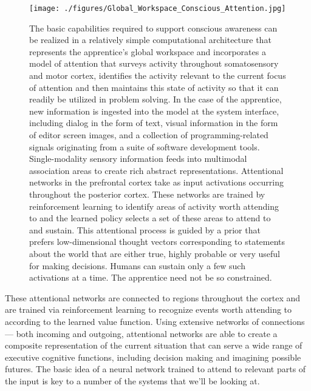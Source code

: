 \documentclass[letterpaper,11pt]{article}
\def\urlh#1{{}}
\def\emdash{---}
\begin{document}

\begin{figure}
%
  \begin{center} 
    \texttt{[image: ./figures/Global\_Workspace\_Conscious\_Attention.jpg]} %
  \end{center}
%
  \caption{The basic capabilities required to support conscious awareness can be realized in a relatively simple computational architecture that represents the apprentice's global workspace and incorporates a model of attention that surveys activity throughout somatosensory and motor cortex, identifies the activity relevant to the current focus of attention and then maintains this state of activity so that it can readily be utilized in problem solving.  In the case of the apprentice, new information is ingested into the model at the system interface, including dialog in the form of text, visual information in the form of editor screen images, and a collection of programming-related signals originating from a suite of software development tools. 
%
Single-modality sensory information feeds into multimodal association areas to create rich abstract representations. Attentional networks in the prefrontal cortex take as input activations occurring throughout the posterior cortex. These networks are trained by reinforcement learning to identify areas of activity worth attending to and the learned policy selects a set of these areas to attend to and sustain. This attentional process is guided by a prior that prefers low-dimensional thought vectors corresponding to statements about the world that are either true, highly probable or very useful for making decisions. Humans can sustain only a few such activations at a time. The apprentice need not be so constrained.}
%
  \label{fig_conscious}
%
\end{figure}

These attentional networks are connected to regions throughout the cortex and are trained via reinforcement learning to recognize events worth attending to according to the learned value function. Using extensive networks of connections {\emdash{}} both incoming and outgoing, attentional networks are able to create a composite representation of the current situation that can serve a wide range of executive cognitive functions, including decision making and imagining possible futures. The basic idea of a neural network trained to attend to relevant parts of the input is key to a number of the systems that we'll be looking at.
\end{document}
